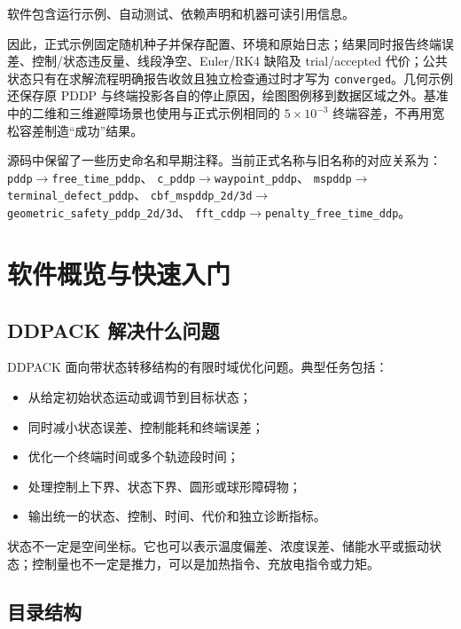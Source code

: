 \documentclass[UTF8,zihao=-4,openany,fontset=fandol]{ctexbook}
\newcommand{\code}[1]{\nolinkurl{#1}}
\begin{document}
软件包含运行示例、自动测试、依赖声明和机器可读引用信息。

因此，正式示例固定随机种子并保存配置、环境和原始日志；结果同时报告终端误差、控制/状态违反量、线段净空、Euler/RK4 缺陷及 trial/accepted 代价；公共状态只有在求解流程明确报告收敛且独立检查通过时才写为 \code{converged}。几何示例还保存原 PDDP 与终端投影各自的停止原因，绘图图例移到数据区域之外。基准中的二维和三维避障场景也使用与正式示例相同的 $5\times10^{-3}$ 终端容差，不再用宽松容差制造“成功”结果。


源码中保留了一些历史命名和早期注释。当前正式名称与旧名称的对应关系为：
\code{pddp}$\rightarrow$\code{free_time_pddp}、
\code{c_pddp}$\rightarrow$\code{waypoint_pddp}、
\code{mspddp}$\rightarrow$\code{terminal_defect_pddp}、
\code{cbf_mspddp_2d/3d}$\rightarrow$\code{geometric_safety_pddp_2d/3d}、
\code{fft_cddp}$\rightarrow$\code{penalty_free_time_ddp}。

\tableofcontents

\mainmatter

\chapter{软件概览与快速入门}

\section{DDPACK 解决什么问题}

DDPACK 面向带状态转移结构的有限时域优化问题。典型任务包括：

\begin{itemize}[leftmargin=2em]
  \item 从给定初始状态运动或调节到目标状态；
  \item 同时减小状态误差、控制能耗和终端误差；
  \item 优化一个终端时间或多个轨迹段时间；
  \item 处理控制上下界、状态下界、圆形或球形障碍物；
  \item 输出统一的状态、控制、时间、代价和独立诊断指标。
\end{itemize}

状态不一定是空间坐标。它也可以表示温度偏差、浓度误差、储能水平或振动状态；控制量也不一定是推力，可以是加热指令、充放电指令或力矩。

\section{目录结构}
\end{document}
